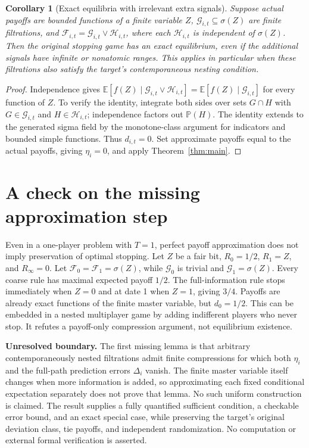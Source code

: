 \documentclass[11pt]{article}
\newtheorem{corollary}[theorem]{Corollary}
\theoremstyle{remark}\newtheorem{remark}[theorem]{Remark}
\newcommand{\E}{\mathbb E}
\newcommand{\Prb}{\mathbb P}
\begin{document}
\begin{corollary}[Exact equilibria with irrelevant extra signals]\label{cor:noise}
Suppose actual payoffs are bounded functions of a finite variable $Z$, $\mathcal G_{i,t}\subseteq\sigma(Z)$ are finite filtrations, and
$\mathcal F_{i,t}=\mathcal G_{i,t}\vee\mathcal H_{i,t}$, where each $\mathcal H_{i,t}$ is independent of $\sigma(Z)$. Then the original stopping game has an exact equilibrium, even if the additional signals have infinite or nonatomic ranges. This applies in particular when these filtrations also satisfy the target's contemporaneous nesting condition.
\end{corollary}
\begin{proof}
Independence gives
$\E[f(Z)\mid\mathcal G_{i,t}\vee\mathcal H_{i,t}]
=\E[f(Z)\mid\mathcal G_{i,t}]$ for every function of $Z$. To verify the identity, integrate both sides over sets $G\cap H$ with $G\in\mathcal G_{i,t}$ and $H\in\mathcal H_{i,t}$; independence factors out $\Prb(H)$. The identity extends to the generated sigma field by the monotone-class argument for indicators and bounded simple functions. Thus $d_{i,t}=0$. Set approximate payoffs equal to the actual payoffs, giving $\eta_i=0$, and apply Theorem~\ref{thm:main}.
\end{proof}

\section*{A check on the missing approximation step}
Even in a one-player problem with $T=1$, perfect payoff approximation does not imply preservation of optimal stopping. Let $Z$ be a fair bit, $R_0=1/2$, $R_1=Z$, and $R_\infty=0$. Let $\mathcal F_0=\mathcal F_1=\sigma(Z)$, while $\mathcal G_0$ is trivial and $\mathcal G_1=\sigma(Z)$. Every coarse rule has maximal expected payoff $1/2$. The full-information rule stops immediately when $Z=0$ and at date 1 when $Z=1$, giving $3/4$. Payoffs are already exact functions of the finite master variable, but $d_0=1/2$. This can be embedded in a nested multiplayer game by adding indifferent players who never stop. It refutes a payoff-only compression argument, not equilibrium existence.

\textbf{Unresolved boundary.} The first missing lemma is that arbitrary contemporaneously nested filtrations admit finite compressions for which both $\eta_i$ and the full-path prediction errors $\Delta_i$ vanish. The finite master variable itself changes when more information is added, so approximating each fixed conditional expectation separately does not prove that lemma. No such uniform construction is claimed. The result supplies a fully quantified sufficient condition, a checkable error bound, and an exact special case, while preserving the target's original deviation class, tie payoffs, and independent randomization. No computation or external formal verification is asserted.
\end{document}

